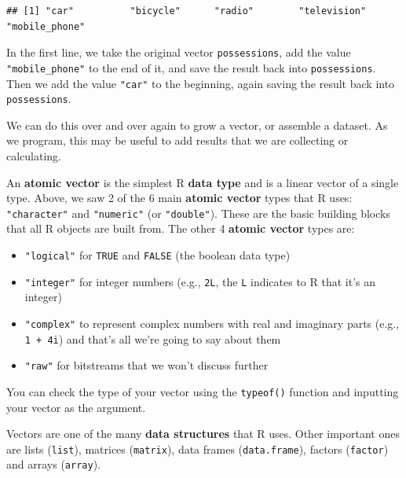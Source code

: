 \documentclass[]{book}
\providecommand{\tightlist}{%
  \setlength{\itemsep}{0pt}\setlength{\parskip}{0pt}}
\begin{document}
\begin{verbatim}
## [1] "car"          "bicycle"      "radio"        "television"   "mobile_phone"
\end{verbatim}

In the first line, we take the original vector \texttt{possessions}, add
the value \texttt{"mobile\_phone"} to the end of it, and save the result
back into \texttt{possessions}. Then we add the value \texttt{"car"} to
the beginning, again saving the result back into \texttt{possessions}.

We can do this over and over again to grow a vector, or assemble a
dataset. As we program, this may be useful to add results that we are
collecting or calculating.

An \textbf{atomic vector} is the simplest R \textbf{data type} and is a
linear vector of a single type. Above, we saw 2 of the 6 main
\textbf{atomic vector} types that R uses: \texttt{"character"} and
\texttt{"numeric"} (or \texttt{"double"}). These are the basic building
blocks that all R objects are built from. The other 4 \textbf{atomic
vector} types are:

\begin{itemize}
\tightlist
\item
  \texttt{"logical"} for \texttt{TRUE} and \texttt{FALSE} (the boolean
  data type)
\item
  \texttt{"integer"} for integer numbers (e.g., \texttt{2L}, the
  \texttt{L} indicates to R that it's an integer)
\item
  \texttt{"complex"} to represent complex numbers with real and
  imaginary parts (e.g., \texttt{1\ +\ 4i}) and that's all we're going
  to say about them
\item
  \texttt{"raw"} for bitstreams that we won't discuss further
\end{itemize}

You can check the type of your vector using the \texttt{typeof()}
function and inputting your vector as the argument.

Vectors are one of the many \textbf{data structures} that R uses. Other
important ones are lists (\texttt{list}), matrices (\texttt{matrix}),
data frames (\texttt{data.frame}), factors (\texttt{factor}) and arrays
(\texttt{array}).
\end{document}
